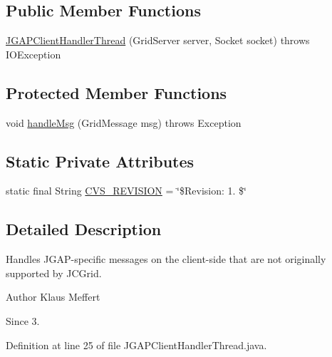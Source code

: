 \subsection*{Public Member Functions}
\begin{DoxyCompactItemize}
\item 
\hyperlink{classorg_1_1jgap_1_1distr_1_1grid_1_1_j_g_a_p_client_handler_thread_ab3bda99b185f1fcb6f19288fe6c59a81}{J\-G\-A\-P\-Client\-Handler\-Thread} (Grid\-Server server, Socket socket)  throws I\-O\-Exception 
\end{DoxyCompactItemize}
\subsection*{Protected Member Functions}
\begin{DoxyCompactItemize}
\item 
void \hyperlink{classorg_1_1jgap_1_1distr_1_1grid_1_1_j_g_a_p_client_handler_thread_a5513a2e631ddea023820d49fc322a781}{handle\-Msg} (Grid\-Message msg)  throws Exception 
\end{DoxyCompactItemize}
\subsection*{Static Private Attributes}
\begin{DoxyCompactItemize}
\item 
static final String \hyperlink{classorg_1_1jgap_1_1distr_1_1grid_1_1_j_g_a_p_client_handler_thread_a1c649d3de6fd7dea383107cf41bab253}{C\-V\-S\-\_\-\-R\-E\-V\-I\-S\-I\-O\-N} = \char`\"{}\$Revision\-: 1. \$\char`\"{}
\end{DoxyCompactItemize}


\subsection{Detailed Description}
Handles J\-G\-A\-P-\/specific messages on the client-\/side that are not originally supported by J\-C\-Grid.

\begin{DoxyAuthor}{Author}
Klaus Meffert 
\end{DoxyAuthor}
\begin{DoxySince}{Since}
3. 
\end{DoxySince}


Definition at line 25 of file J\-G\-A\-P\-Client\-Handler\-Thread.\-java.



